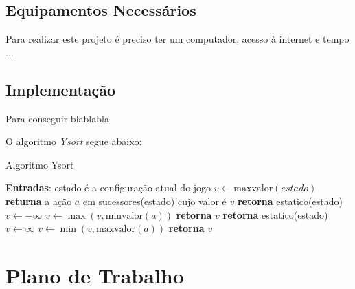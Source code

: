 \documentclass[a4paper,10pt]{article}  %
\begin{document}
 \subsection{Equipamentos Necessários}


  Para realizar este projeto é preciso ter um computador, acesso à internet e tempo ...



 \subsection{Implementação}

 Para conseguir blablabla


 O algoritmo \textit{Ysort} segue abaixo:

\begin{algorithm}
\caption{Algoritmo Ysort}\label{alg:ysort}
\begin{algorithmic}[1]
\State \textbf{Entradas}: estado é a configuração atual do jogo
\State $v\gets \mathrm{maxvalor}{(estado)}$
\State \textbf{returna} a ação $a$ em sucessores(estado) cujo valor é $v$ %
\EndFunction
{}
   \State \textbf{retorna} estatico(estado)
\EndIf
\State $v \gets -\infty$
    \State $v \gets \max{(v, \mathrm{minvalor}(a))}$
\EndFor
\State \textbf{retorna} $v$
\EndFunction
{}
   \State \textbf{retorna} estatico(estado)
\EndIf
\State $v \gets \infty$
    \State $v \gets \min{(v, \mathrm{maxvalor}(a))}$
\EndFor
\State \textbf{retorna} $v$
\EndFunction
\end{algorithmic}
\end{algorithm}


\section{Plano de Trabalho}
\end{document}
